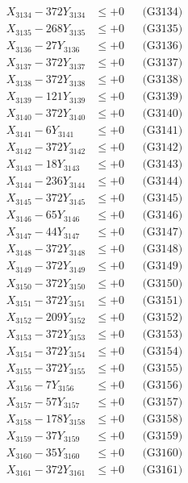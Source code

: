 \documentclass[a4paper,10pt]{article}
\begin{document}
{\begin{align}
X_{3134} - 372Y_{3134} &\leq +0 && \text{(G3134)} \\
X_{3135} - 268Y_{3135} &\leq +0 && \text{(G3135)} \\
X_{3136} - 27Y_{3136} &\leq +0 && \text{(G3136)} \\
X_{3137} - 372Y_{3137} &\leq +0 && \text{(G3137)} \\
X_{3138} - 372Y_{3138} &\leq +0 && \text{(G3138)} \\
X_{3139} - 121Y_{3139} &\leq +0 && \text{(G3139)} \\
X_{3140} - 372Y_{3140} &\leq +0 && \text{(G3140)} \\
\allowbreak
X_{3141} - 6Y_{3141} &\leq +0 && \text{(G3141)} \\
X_{3142} - 372Y_{3142} &\leq +0 && \text{(G3142)} \\
X_{3143} - 18Y_{3143} &\leq +0 && \text{(G3143)} \\
X_{3144} - 236Y_{3144} &\leq +0 && \text{(G3144)} \\
X_{3145} - 372Y_{3145} &\leq +0 && \text{(G3145)} \\
X_{3146} - 65Y_{3146} &\leq +0 && \text{(G3146)} \\
X_{3147} - 44Y_{3147} &\leq +0 && \text{(G3147)} \\
X_{3148} - 372Y_{3148} &\leq +0 && \text{(G3148)} \\
X_{3149} - 372Y_{3149} &\leq +0 && \text{(G3149)} \\
X_{3150} - 372Y_{3150} &\leq +0 && \text{(G3150)} \\
\allowbreak
X_{3151} - 372Y_{3151} &\leq +0 && \text{(G3151)} \\
X_{3152} - 209Y_{3152} &\leq +0 && \text{(G3152)} \\
X_{3153} - 372Y_{3153} &\leq +0 && \text{(G3153)} \\
X_{3154} - 372Y_{3154} &\leq +0 && \text{(G3154)} \\
X_{3155} - 372Y_{3155} &\leq +0 && \text{(G3155)} \\
X_{3156} - 7Y_{3156} &\leq +0 && \text{(G3156)} \\
X_{3157} - 57Y_{3157} &\leq +0 && \text{(G3157)} \\
X_{3158} - 178Y_{3158} &\leq +0 && \text{(G3158)} \\
X_{3159} - 37Y_{3159} &\leq +0 && \text{(G3159)} \\
X_{3160} - 35Y_{3160} &\leq +0 && \text{(G3160)} \\
\allowbreak
X_{3161} - 372Y_{3161} &\leq +0 && \text{(G3161)} \\

\end{align}}
\end{document}
